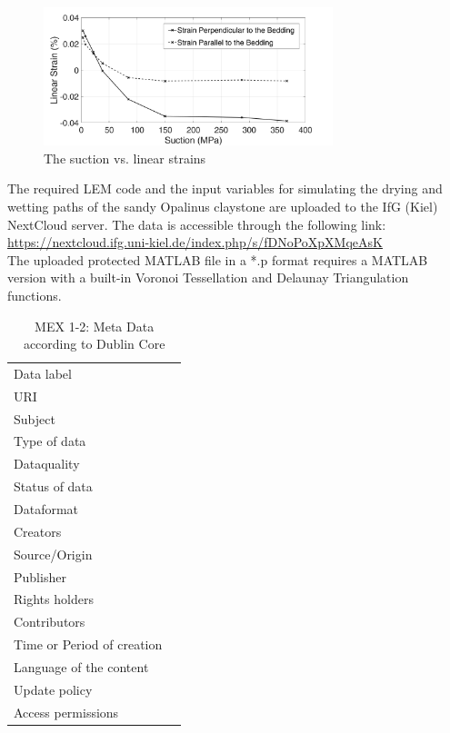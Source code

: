 \begin{figure}[!ht]
\centering
\includegraphics[width=0.75\textwidth]{figures/Amir_ME6_Strain_Data.png}
\caption{The suction vs. linear strains}
\label{fig:Amir_ME6_Strain_Data}
\end{figure}


The required LEM code and the input variables for simulating the drying and wetting paths of the sandy Opalinus claystone are uploaded to the IfG (Kiel) NextCloud server. The data is accessible through the following link:\\
\hyperlink{https://nextcloud.ifg.uni-kiel.de/index.php/s/fDNoPoXpXMqeAsK}{https://nextcloud.ifg.uni-kiel.de/index.php/s/fDNoPoXpXMqeAsK}\\

The uploaded protected MATLAB file in a *.p format requires a MATLAB version with a built-in Voronoi Tessellation and Delaunay Triangulation functions.


\begin{table}[h!]
\caption{MEX 1-2: Meta Data according to Dublin Core}
\label{tab:}
\small
\begin{tabular}{R{3cm}|L{7cm}}
\hline
%
Data label &  \\
URI &  \\
Subject  &  \\
Type of data  &  \\
Dataquality  &  \\
Status of data  &  \\
Dataformat  & \\
Creators  &  \\
Source/Origin &  \\
Publisher  &  \\
Rights holders &  \\
Contributors &  \\
Time or Period of creation &  \\
Language of the content &  \\
Update policy &  \\
Access permissions &  \\
%
\hline
\end{tabular}
\end{table}

